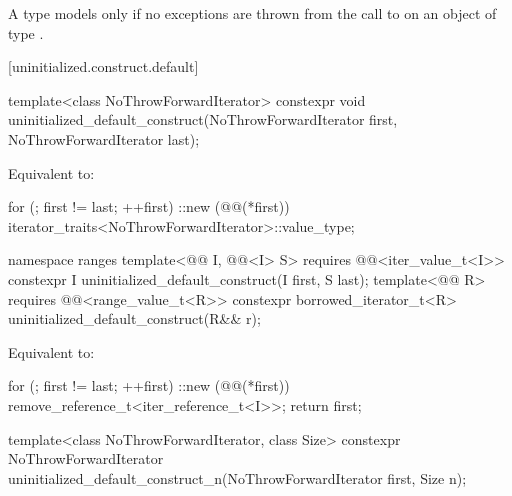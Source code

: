 \begin{itemdescr}
\pnum
A type  models 
only if no exceptions are thrown from the call to 
on an object of type .
\end{itemdescr}

[uninitialized.construct.default]{}

%
\begin{itemdecl}
template<class NoThrowForwardIterator>
  constexpr void uninitialized_default_construct(NoThrowForwardIterator first,
                                                 NoThrowForwardIterator last);
\end{itemdecl}

\begin{itemdescr}
\pnum
\effects
Equivalent to:
\begin{codeblock}
for (; first != last; ++first)
  ::new (@@(*first)) iterator_traits<NoThrowForwardIterator>::value_type;
\end{codeblock}
\end{itemdescr}

%
\begin{itemdecl}
namespace ranges {
  template<@@ I, @@<I> S>
    requires @@<iter_value_t<I>>
    constexpr I uninitialized_default_construct(I first, S last);
  template<@@ R>
    requires @@<range_value_t<R>>
    constexpr borrowed_iterator_t<R> uninitialized_default_construct(R&& r);
}
\end{itemdecl}

\begin{itemdescr}
\pnum
\effects
Equivalent to:
\begin{codeblock}
for (; first != last; ++first)
  ::new (@@(*first)) remove_reference_t<iter_reference_t<I>>;
return first;
\end{codeblock}
\end{itemdescr}

%
\begin{itemdecl}
template<class NoThrowForwardIterator, class Size>
  constexpr NoThrowForwardIterator
    uninitialized_default_construct_n(NoThrowForwardIterator first, Size n);
\end{itemdecl}

